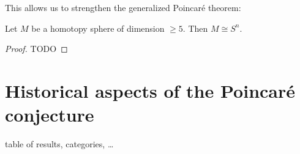 \begin{theorem}
    
\end{theorem}

This allows us to strengthen the generalized Poincaré theorem:
\begin{theorem}
    Let $M$ be a homotopy sphere of dimension  $\ge  5$. Then $M \cong S^{n}$.
\end{theorem}
\begin{proof}
    TODO
\end{proof}


\section{Historical aspects of the Poincaré conjecture}

table of results, categories, \ldots

